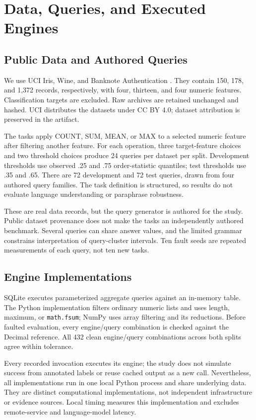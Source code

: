 \documentclass{svproc}
\begin{document}
\section{Data, Queries, and Executed Engines}
\subsection{Public Data and Authored Queries}
We use UCI Iris, Wine, and Banknote Authentication \cite{iris,wine,banknote}. They contain 150, 178, and 1,372 records, respectively, with four, thirteen, and four numeric features. Classification targets are excluded. Raw archives are retained unchanged and hashed. UCI distributes the datasets under CC BY 4.0; dataset attribution is preserved in the artifact.

The tasks apply COUNT, SUM, MEAN, or MAX to a selected numeric feature after filtering another feature. For each operation, three target-feature choices and two threshold choices produce 24 queries per dataset per split. Development thresholds use observed .25 and .75 order-statistic quantiles; test thresholds use .35 and .65. There are 72 development and 72 test queries, drawn from four authored query families. The task definition is structured, so results do not evaluate language understanding or paraphrase robustness.

These are real data records, but the query generator is authored for the study. Public dataset provenance does not make the tasks an independently authored benchmark. Several queries can share answer values, and the limited grammar constrains interpretation of query-cluster intervals. Ten fault seeds are repeated measurements of each query, not ten new tasks.

\subsection{Engine Implementations}
SQLite executes parameterized aggregate queries against an in-memory table. The Python implementation filters ordinary numeric lists and uses length, maximum, or \texttt{math.fsum}; NumPy uses array filtering and its reductions. Before faulted evaluation, every engine/query combination is checked against the Decimal reference. All 432 clean engine/query combinations across both splits agree within tolerance.

Every recorded invocation executes its engine; the study does not simulate success from annotated labels or reuse cached output as a new call. Nevertheless, all implementations run in one local Python process and share underlying data. They are distinct computational implementations, not independent infrastructure or evidence sources. Local timing measures this implementation and excludes remote-service and language-model latency.
\end{document}
